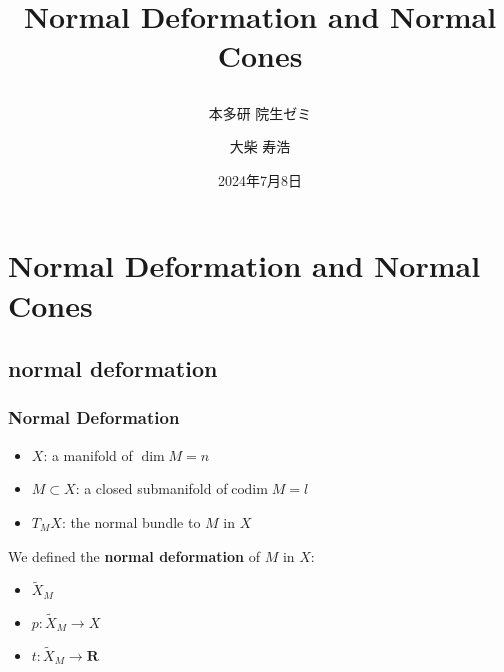 \documentclass[dvipdfmx,12pt,aspectratio=169,leqno]{beamer}%
\newcommand{\rr}{\mathbf{R}}
\numberwithin{equation}{subsection}
\newcommand{\codim}{\mathop{\mathrm{codim}}\nolimits}
\theoremstyle{mystyle}
\begin{document}
    
\title{Normal Deformation and Normal Cones\subtitle{本多研 院生ゼミ}}
\date{2024年7月8日}
\author{大柴 寿浩}




\begin{frame}
    \titlepage
\end{frame}
\begin{comment}
    \begin{frame}\frametitle{書くこと}
    \begin{itemize}
        \item 特に興味を持った定理や理論の背景
        \item それを記述するための記号や概念の導入
        \item 正確な主張の紹介
        \item 証明の基本的なアイデアやアウトラインの紹介
        \item または定理の過程を満たす具体例や定理の応用例の紹介
    \end{itemize}
    \end{frame}
\end{comment}
\setcounter{section}{3}
\section[sect.4.1]{Normal Deformation and Normal Cones\cite[sect.4.1]{KS90}}
\subsection{normal deformation}
\begin{frame}
    \frametitle{Normal Deformation}

    \begin{itemize}
        \item \(X\): a manifold of \(\dim{M}=n\)
        \item \(M\subset X\): a closed submanifold of\(\codim{M}=l\)
        \item \(T_{M}X\): the normal bundle to \(M\) in \(X\)
    \end{itemize}

    We defined the \textbf{normal deformation} of \(M\) in \(X\):
    \begin{itemize}
        \item \(\widetilde{X}_{M}\)
        \item \(p\colon \widetilde{X}_{M}\to X\)
        \item \(t\colon \widetilde{X}_{M}\to\rr\)
    \end{itemize}
\end{frame}
\end{document}
